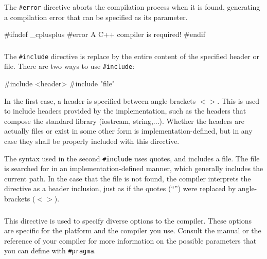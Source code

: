 \documentclass[10pt,a4paper]{scrartcl}
\begin{document}
\begin{multicols*}{2}
The \verb+#error+ directive aborts the compilation process when it is found, generating a compilation error that can be specified as its parameter.

\begin{TPCpp}
#ifndef _cplusplus
#error A C++ compiler is required!
#endif
\end{TPCpp}

\subsubsection{}

The \verb+#include+ directive is replace by the entire content of the specified header or file. There are two ways to use \verb+#include+:

\begin{TPCpp}
#include <header>
#include "file"
\end{TPCpp}

In the first case, a header is specified between angle-brackets $<>$. This is used to include headers provided by the implementation, such as the headers that compose the standard library (iostream, string,...). Whether the headers are actually files or exist in some other form is implementation-defined, but in any case they shall be properly included with this directive.

The syntax used in the second \verb+#include+ uses quotes, and includes a file. The file is searched for in an implementation-defined manner, which generally includes the current path. In the case that the file is not found, the compiler interprets the directive as a header inclusion, just as if the quotes (``'') were replaced by angle-brackets ($<>$).

\subsubsection{}

This directive is used to specify diverse options to the compiler. These options are specific for the platform and the compiler you use. Consult the manual or the reference of your compiler for more information on the possible parameters that you can define with \verb+#pragma+.

\subsubsection{}


\end{multicols*}
\end{document}
